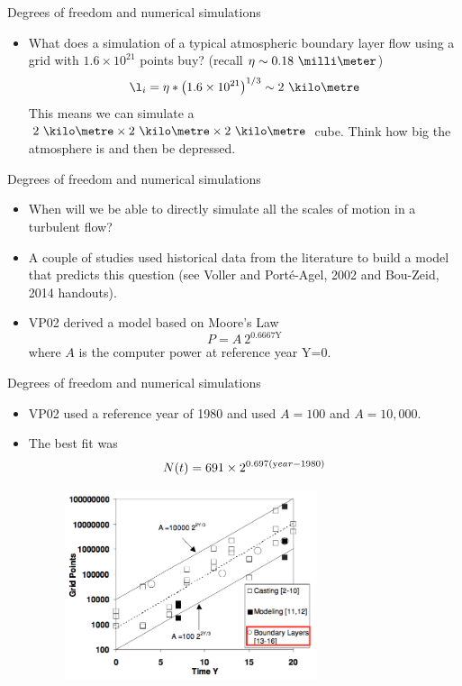 
\begin{frame}{Degrees of freedom and numerical simulations}

\begin{itemize}
	\item What does a simulation of a typical atmospheric boundary layer flow using a grid with $1.6\times 10^{21}$ points buy? (recall $\eta \sim 0.18\ \milli\meter$)
	$$\l_i = \eta * \left(1.6\times 10^{21}\right)^{1/3} \sim 2\ \kilo\metre$$
	This means we can simulate a $2\ \kilo\metre \times 2\ \kilo\metre \times 2\ \kilo\metre$ cube.
	Think how big the atmosphere is and then be depressed.
\end{itemize}
\end{frame}


\begin{frame}{Degrees of freedom and numerical simulations}

\begin{itemize}
	\item When will we be able to directly simulate all the scales of motion in a turbulent flow?
	\item A couple of studies used historical data from the literature to build a model that predicts this question (see Voller and Port\'{e}-Agel, 2002 and Bou-Zeid, 2014 handouts).
	\item VP02 derived a model based on Moore's Law $$P = A\ 2^{0.6667\text{Y}}$$ where $A$ is the computer power at reference year Y=0.
\end{itemize}
\end{frame}


\begin{frame}{Degrees of freedom and numerical simulations}

\begin{itemize}
	\item VP02 used a reference year of 1980 and used $A=100$ and $A=10,000$.
	\item The best fit was $$N(t) = 691 \times 2^{0.697(\text year - 1980)}$$
	\begin{figure}
		\includegraphics[width=0.7\textwidth]{mooreslaw1.png}
	\end{figure}
\end{itemize}
\end{frame}

